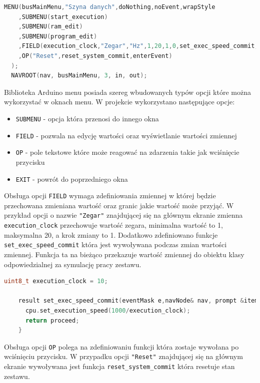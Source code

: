 \documentclass[../main.tex]{subfiles}
\begin{document}
\begin{lstlisting}[language=C++]
    MENU(busMainMenu,"Szyna danych",doNothing,noEvent,wrapStyle
    ,SUBMENU(start_execution)
    ,SUBMENU(ram_edit)
    ,SUBMENU(program_edit)
    ,FIELD(execution_clock,"Zegar","Hz",1,20,1,0,set_exec_speed_commit,anyEvent,wrapStyle)
    ,OP("Reset",reset_system_commit,enterEvent)
  );
  NAVROOT(nav, busMainMenu, 3, in, out);
\end{lstlisting}

\par
Biblioteka Arduino menu posiada szereg wbudowanych typów opcji które można wykorzystać w oknach menu. W projekcie wykorzystano
następujące opcje:
\begin{itemize}
    \item \texttt{SUBMENU} - opcja która przenosi do innego okna
    \item \texttt{FIELD} - pozwala na edycję wartości oraz wyświetlanie wartości zmiennej
    \item \texttt{OP} - pole tekstowe które może reagować na zdarzenia takie jak wciśnięcie przycisku
    \item \texttt{EXIT} - powrót do poprzedniego okna
\end{itemize}

\par
Obsługa opcji \texttt{FIELD} wymaga zdefiniowania zmiennej w której będzie przechowana zmieniana wartość oraz granic jakie wartość może przyjąć.
W przykład opcji o nazwie \texttt{"Zegar"} znajdującej się na głównym ekranie zmienna \texttt{execution\_clock} przechowuje wartość zegara,
minimalna wartość to 1, maksymalna 20, a krok zmiany to 1. Dodatkowo zdefiniowano funkcje \texttt{set\_exec\_speed\_commit} która jest wywoływana
podczas zmian wartości zmiennej. Funkcja ta na bieżąco przekazuje wartość zmiennej do obiektu klasy odpowiedzialnej za symulację pracy zestawu.

\begin{lstlisting}[language=C++]
    uint8_t execution_clock = 10;

    result set_exec_speed_commit(eventMask e,navNode& nav, prompt &item) {
      cpu.set_execution_speed(1000/execution_clock);
      return proceed;
    }
\end{lstlisting}

\par
Obsługa opcji \texttt{OP} polega na zdefiniowaniu funkcji która zostaje wywołana po wciśnięciu przycisku. W przypadku opcji \texttt{"Reset"}
znajdującej się na głównym ekranie wywoływana jest funkcja \texttt{reset\_system\_commit} która resetuje stan zestawu.
\end{document}
